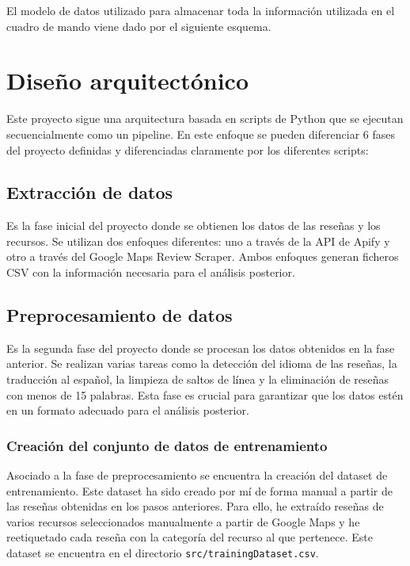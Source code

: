El modelo de datos utilizado para almacenar toda la información utilizada en el cuadro de mando viene dado por el siguiente esquema.


\section{Diseño arquitectónico}

Este proyecto sigue una arquitectura basada en scripts de Python que se ejecutan secuencialmente como un pipeline.
En este enfoque se pueden diferenciar 6 fases del proyecto definidas y diferenciadas claramente por los diferentes scripts:

\subsection{Extracción de datos}

Es la fase inicial del proyecto donde se obtienen los datos de las reseñas y los recursos. 
Se utilizan dos enfoques diferentes: uno a través de la API de Apify y otro a través del Google Maps Review Scraper.
Ambos enfoques generan ficheros CSV con la información necesaria para el análisis posterior.

\subsection{Preprocesamiento de datos}

Es la segunda fase del proyecto donde se procesan los datos obtenidos en la fase anterior.
Se realizan varias tareas como la detección del idioma de las reseñas, la traducción al español, la limpieza de saltos de línea y la eliminación de reseñas con menos de 15 palabras.
Esta fase es crucial para garantizar que los datos estén en un formato adecuado para el análisis posterior.

\subsubsection{Creación del conjunto de datos de entrenamiento}

Asociado a la fase de preprocesamiento se encuentra la creación del dataset de entrenamiento.
Este dataset ha sido creado por mí de forma manual a partir de las reseñas obtenidas en los pasos anteriores.
Para ello, he extraído reseñas de varios recursos seleccionados manualmente a partir de Google Maps y he reetiquetado cada reseña con la categoría del recurso al que pertenece.
Este dataset se encuentra en el directorio \texttt{src/trainingDataset.csv}.

